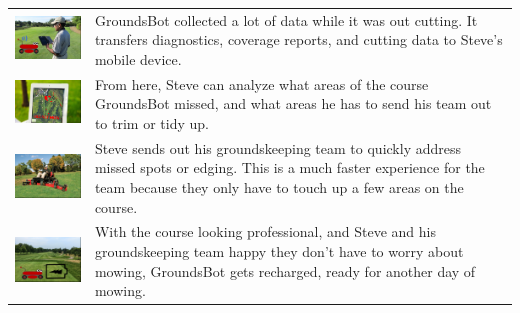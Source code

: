 \documentclass[12pt]{extarticle}
\begin{document}
\begin{table}[H]
   \def\arraystretch{4}
   \setlength\tabcolsep{8pt}


\begin{tabularx}{\textwidth}{cX}
\includegraphics[width=6cm, valign=t]{usecase2_2.png} &
GroundsBot collected a lot of data while it was out cutting.  It transfers diagnostics, coverage reports, and cutting data to Steve’s mobile device.
\\
\includegraphics[width=6cm, valign=t]{usecase2_3.png} &
From here, Steve can analyze what areas of the course GroundsBot missed, and what areas he has to send his team out to trim or tidy up.
\\
\includegraphics[width=6cm, valign=t]{usecase2_4.png} &
Steve sends out his groundskeeping team to quickly address missed spots or edging.  This is a much faster experience for the team because they only have to touch up a few areas on the course.
\\
\includegraphics[width=6cm, valign=t]{usecase2_5.png} &
With the course looking professional, and Steve and his groundskeeping team happy they don’t have to worry about mowing, GroundsBot gets recharged, ready for another day of mowing.
\\

\end{tabularx}
\end{table}
\end{document}

